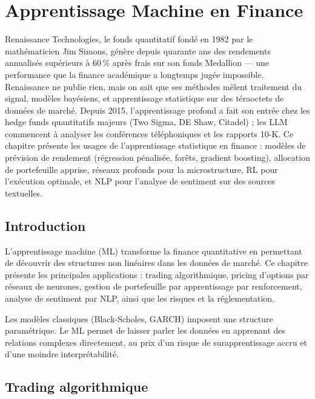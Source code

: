 \chapter{Apprentissage Machine en Finance}
\label{ch:ml_finance}

Renaissance Technologies, le fonds quantitatif fondé en 1982 par le mathématicien Jim Simons, génère depuis quarante ans des rendements annualisés supérieurs à 60\,\% après frais sur son fonds Medallion --- une performance que la finance académique a longtemps jugée impossible. Renaissance ne publie rien, mais on sait que ses méthodes mêlent traitement du signal, modèles bayésiens, et apprentissage statistique sur des téraoctets de données de marché. Depuis 2015, l'apprentissage profond a fait son entrée chez les hedge funds quantitatifs majeurs (Two Sigma, DE Shaw, Citadel) ; les LLM commencent à analyser les conférences téléphoniques et les rapports 10-K. Ce chapitre présente les usages de l'apprentissage statistique en finance : modèles de prévision de rendement (régression pénalisée, forêts, gradient boosting), allocation de portefeuille apprise, réseaux profonds pour la microstructure, RL pour l'exécution optimale, et NLP pour l'analyse de sentiment sur des sources textuelles.

\section{Introduction}

L'apprentissage machine (ML) transforme la
finance quantitative en permettant de d\'ecouvrir des structures non lin\'eaires
dans les donn\'ees de march\'e. Ce chapitre pr\'esente les principales
applications : trading algorithmique, pricing d'options par r\'eseaux de
neurones, gestion de portefeuille par apprentissage par renforcement, analyse
de sentiment par NLP, ainsi que les risques et la r\'eglementation.

\begin{intuition}
Les mod\`eles classiques (Black-Scholes, GARCH) imposent une structure
param\'etrique. Le ML permet de \og laisser parler les donn\'ees \fg en
apprenant des relations complexes directement, au prix d'un risque de
surapprentissage accru et d'une moindre interpr\'etabilit\'e.
\end{intuition}

\section{Trading algorithmique}

